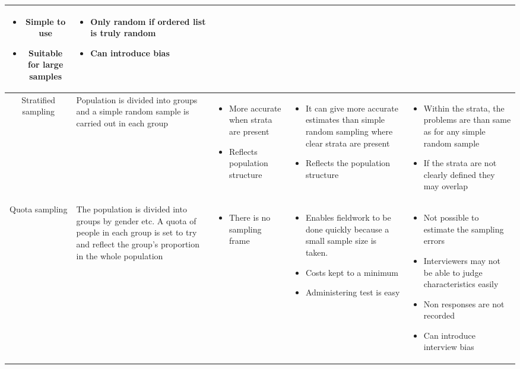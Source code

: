 \documentclass{article}[5pt]
\begin{document}
\begin{tabularx}{\textwidth}{|c|X|X|X|X|}
\begin{itemize}
\item Simple to use
\item Suitable for large samples
\end{itemize}&
\begin{itemize}
\item Only random if ordered list is truly random
\item Can introduce bias
\end{itemize}\\
\hline


Stratified sampling
&Population is divided into groups and a simple random sample is carried out in each group&

\begin{itemize}
\item More accurate when strata are present
\item Reflects population structure
\end{itemize}&

\begin{itemize}
\item It can give more accurate estimates than simple random sampling where clear strata are present
\item Reflects the population structure
\end{itemize}&
\begin{itemize}
\item Within the strata, the problems are than same as for any simple random sample
\item If the strata are not clearly defined they may overlap
\end{itemize}\\
\hline

Quota sampling
&The population is divided into groups by gender etc. A quota of people in each group is set to try and reflect the group's proportion in the whole population&
\begin{itemize}
\item There is no sampling frame
\end{itemize}&

\begin{itemize}
\item Enables fieldwork to be done quickly because a small sample size is taken.
\item Costs kept to a minimum
\item Administering test is easy
\end{itemize}&
\begin{itemize}
\item Not possible to estimate the sampling errors
\item Interviewers may not be able to judge characteristics easily
\item Non responses are not recorded
\item Can introduce interview bias
\end{itemize}\\
\hline
\end{tabularx}
\end{document}
